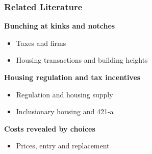 \begin{frame}
    \frametitle{Related Literature}

    \textbf{Bunching at kinks and notches}
    \begin{itemize}[itemsep=2pt, topsep=3pt]
        \item Taxes and firms \cite{saez2010,chetty2011,klevenwaseem2013,kleven2016,garicano2016}
        \item Housing transactions and building heights \cite{kopczukmunroe2015,bestkleven2018,brueckner2024}
    \end{itemize}

    \vspace{2pt}
    \textbf{Housing regulation and tax incentives}
    \begin{itemize}[itemsep=2pt, topsep=3pt]
        \item Regulation and housing supply \cite{glaeser2005}
        \item Inclusionary housing and 421-a \cite{schuetz2011,soltas2024}
    \end{itemize}

    \vspace{2pt}
    \textbf{Costs revealed by choices}
    \begin{itemize}[itemsep=2pt, topsep=3pt]
        \item Prices, entry and replacement \cite{rust1987,bresnahanreiss1991,blp1995}
    \end{itemize}
\end{frame}
